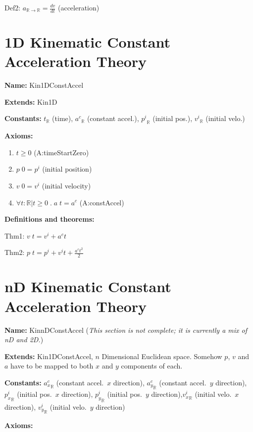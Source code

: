 \documentclass{article}
\begin{document}
Def2: $a_{\mathbb{R} \rightarrow \mathbb{R}} = \frac{dv}{dt}$ (acceleration)

\section{1D Kinematic Constant Acceleration Theory}

\noindent \textbf{Name:} Kin1DConstAccel

\noindent \textbf{Extends:} Kin1D

\noindent \textbf{Constants:} $t_{\mathbb{R}}$ (time), ${a^c}_{\mathbb{R}}$
(constant accel.), ${p^i}_{\mathbb{R}}$ (initial pos.), ${v^i}_{\mathbb{R}}$ (initial velo.)

\noindent \textbf{Axioms:}

\begin{enumerate}
    \item $t \geq 0$ (A:timeStartZero)
    \item $p \; 0 = p^i$ (initial position)
    \item $v \; 0 = v^i$ (initial velocity)
    \item $\forall t: \mathbb{R} | t \geq 0 \; . \; a \; t = a^c$ (A:constAccel)
\end{enumerate}

\noindent \textbf{Definitions and theorems:}

Thm1: $v \; t = v^i + a^c t$

Thm2: $p \; t = p^i + v^i t + \frac{a^c t^2}{2}$


\section{nD Kinematic Constant Acceleration Theory}

\noindent \textbf{Name:} KinnDConstAccel (\textit{This section is not complete;
it is currently a mix of nD and 2D.})

\noindent \textbf{Extends:} Kin1DConstAccel, $n$ Dimensional Euclidean space.  Somehow $p$, $v$ and $a$
have to be mapped to both $x$ and $y$ components of each.

\noindent \textbf{Constants:} ${a_x^c}_{\mathbb{R}}$ (constant accel.\ $x$
direction), ${a_y^c}_{\mathbb{R}}$ (constant accel.\ $y$ direction),
${p_x^i}_{\mathbb{R}}$ (initial pos.\ $x$ direction), ${p_y^i}_{\mathbb{R}}$
(initial pos.\ $y$ direction),${v_x^i}_{\mathbb{R}}$ (initial velo.\ $x$
direction), ${v_y^i}_{\mathbb{R}}$ (initial velo.\ $y$ direction) 

\noindent \textbf{Axioms:}
\end{document}

